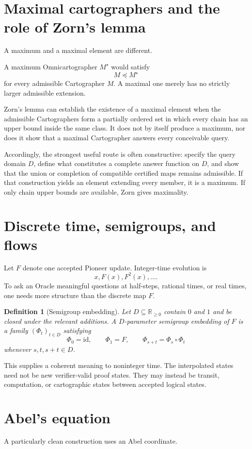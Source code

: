 \documentclass[11pt]{article}
\newtheorem{definition}[theorem]{Definition}
\newcommand{\Rge}{\mathbb{R}_{\ge 0}}
\begin{document}
\section{Maximal cartographers and the role of Zorn's lemma}
A maximum and a maximal element are different.

A maximum Omnicartographer $M^\star$ would satisfy
\[
M\preceq M^\star
\]
for every admissible Cartographer $M$. A maximal one merely has no strictly larger admissible extension.

Zorn's lemma can establish the existence of a maximal element when the admissible Cartographers form a partially ordered set in which every chain has an upper bound inside the same class. It does not by itself produce a maximum, nor does it show that a maximal Cartographer answers every conceivable query.

Accordingly, the strongest useful route is often constructive: specify the query domain $D$, define what constitutes a complete answer function on $D$, and show that the union or completion of compatible certified maps remains admissible. If that construction yields an element extending every member, it is a maximum. If only chain upper bounds are available, Zorn gives maximality.

\section{Discrete time, semigroups, and flows}
Let $F$ denote one accepted Pioneer update. Integer-time evolution is
\[
x,F(x),F^2(x),\ldots.
\]
To ask an Oracle meaningful questions at half-steps, rational times, or real times, one needs more structure than the discrete map $F$.

\begin{definition}[Semigroup embedding]
Let $D\subseteq\Rge$ contain $0$ and $1$ and be closed under the relevant additions. A $D$-parameter semigroup embedding of $F$ is a family $(\Phi_t)_{t\in D}$ satisfying
\[
\Phi_0=\mathrm{id},\qquad \Phi_1=F,\qquad \Phi_{s+t}=\Phi_s\circ\Phi_t
\]
whenever $s,t,s+t\in D$.
\end{definition}

This supplies a coherent meaning to noninteger time. The interpolated states need not be new verifier-valid proof states. They may instead be transit, computation, or cartographic states between accepted logical states.

\section{Abel's equation}
A particularly clean construction uses an Abel coordinate.
\end{document}

